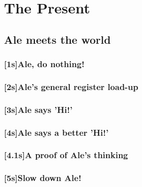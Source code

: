 \documentclass[12pt, a4paper]{book}
\begin{document}
\part[The Present]{The Present\\[2ex]
}

\chapter{Ale meets the world}
\section{[1s]Ale, do nothing!}
\section{[2s]Ale's general register load-up}
\section{[3s]Ale says 'Hi!'}
\section{[4s]Ale says a better 'Hi!'}
\section{[4.1s]A proof of Ale's thinking}
\section{[5s]Slow down Ale!}
\end{document}
